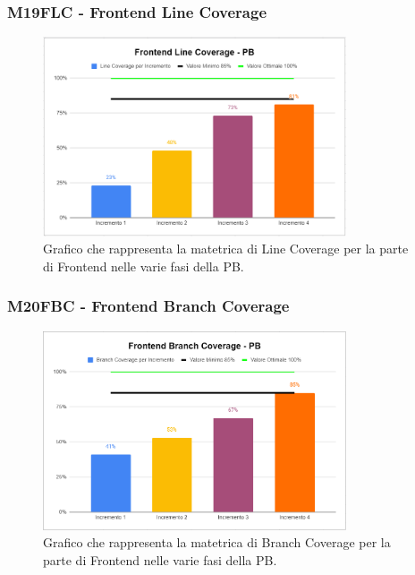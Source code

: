\subsubsection{M19FLC - Frontend Line Coverage}
\begin{figure}[H]
  \centering\includegraphics[width=0.8\textwidth, height=0.8\textheight,keepaspectratio]{images/PB-Frontend-Line.png}
  \caption{Grafico che rappresenta la matetrica di Line Coverage per la parte di Frontend nelle varie fasi della PB.}
\end{figure}    

\subsubsection{M20FBC - Frontend Branch Coverage}
\begin{figure}[H]
  \centering\includegraphics[width=0.8\textwidth, height=0.8\textheight,keepaspectratio]{images/PB-Frontend-Branch.png}
  \caption{Grafico che rappresenta la matetrica di Branch Coverage per la parte di Frontend nelle varie fasi della PB.}
\end{figure}    

